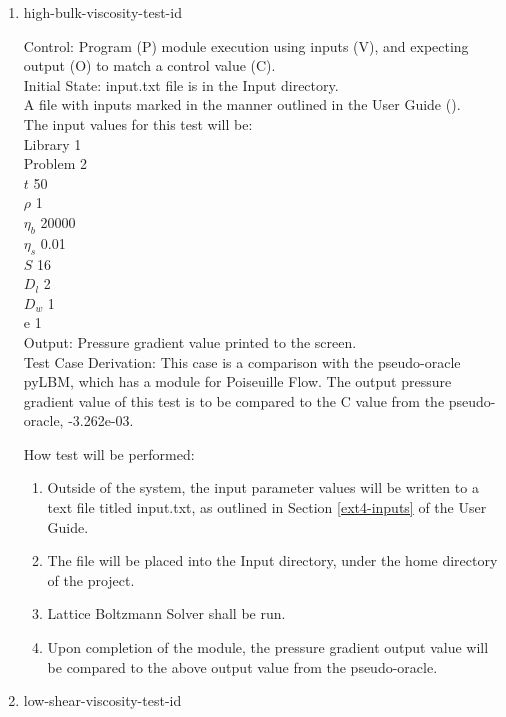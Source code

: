 \documentclass[12pt, titlepage]{article}
\newcommand{\famname}{Lattice Boltzmann Solver}
\newcounter{testcounter} %
\begin{document}
\begin{enumerate}
\item{high-bulk-viscosity-test-id\thetestcounter \\}

Control: Program (P) module execution using inputs (V), and expecting output (O) to match a control value (C).\\
					
Initial State: input.txt file is in the Input directory.\\
					
A file with inputs marked in the manner outlined in the User
Guide (\citet{LBM_UserGuide_PM}).\\The input values for this test will be:\\
Library 1\\
Problem 2\\
$t$ 50\\
$\rho$ 1\\
$\eta_b$ 20000\\
$\eta_s$ 0.01\\
$S$ 16\\
$D_{l}$ 2\\
$D_{w}$ 1\\
$\mathrm{e}$ 1\\

Output: Pressure gradient value printed to the screen.  \\

Test Case Derivation: This case is a comparison with the pseudo-oracle pyLBM,
which has a module for Poiseuille Flow. The output pressure gradient value of
this test is to be compared to the C value from the pseudo-oracle,
-3.262e-03.\

How test will be performed: 

\begin{enumerate}
\item Outside of the system, the input parameter values will be written to a text file titled input.txt, as outlined in Section \ref{ext4-inputs} of the User Guide.
\item The file will be placed into the Input directory, under the home directory
of the project.
\item {\famname} shall be run.
\item Upon completion of the module, the pressure gradient output value will be
compared to the above output value from the pseudo-oracle.
\end{enumerate}	

\item{low-shear-viscosity-test-id\thetestcounter \\}


\end{enumerate}
\end{document}
